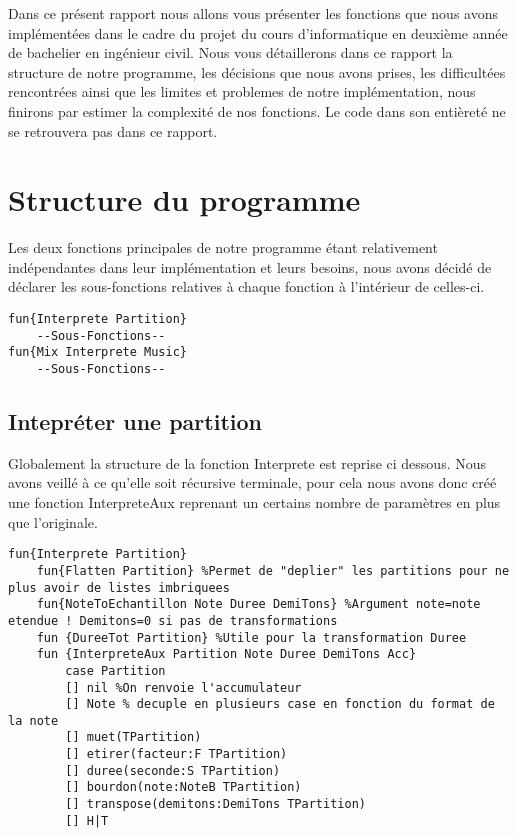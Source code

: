 \documentclass[a4paper,12pt]{report}
\begin{document}



Dans ce présent rapport nous allons vous présenter les fonctions que nous avons implémentées dans le cadre du projet du cours d'informatique en deuxième année de bachelier en ingénieur civil. Nous vous détaillerons dans ce rapport la structure de notre programme, les décisions que nous avons prises, les difficultées rencontrées ainsi que les limites et problemes de notre implémentation, nous finirons par estimer la complexité de nos fonctions. Le code dans son entièreté ne se retrouvera pas dans ce rapport.

\section*{Structure du programme}
Les deux fonctions principales de notre programme étant relativement indépendantes dans leur implémentation et leurs besoins, nous avons décidé de déclarer les sous-fonctions relatives à chaque fonction à l'intérieur de celles-ci.
\begin{lstlisting}[frame=single] 
fun{Interprete Partition}
	--Sous-Fonctions--
fun{Mix Interprete Music}
	--Sous-Fonctions--
\end{lstlisting}

\subsection*{Intepréter une partition}
Globalement la structure de la fonction Interprete est reprise ci dessous. Nous avons veillé à ce qu'elle soit récursive terminale, pour cela nous avons donc créé une fonction InterpreteAux reprenant un certains nombre de paramètres en plus que l'originale. 
\begin{lstlisting}[frame=single] 
fun{Interprete Partition}
	fun{Flatten Partition} %Permet de "deplier" les partitions pour ne plus avoir de listes imbriquees
	fun{NoteToEchantillon Note Duree DemiTons} %Argument note=note etendue ! Demitons=0 si pas de transformations
	fun {DureeTot Partition} %Utile pour la transformation Duree 
	fun {InterpreteAux Partition Note Duree DemiTons Acc}
		case Partition
		[] nil %On renvoie l'accumulateur
		[] Note % decuple en plusieurs case en fonction du format de la note
		[] muet(TPartition)
		[] etirer(facteur:F TPartition)
		[] duree(seconde:S TPartition)
		[] bourdon(note:NoteB TPartition)
		[] transpose(demitons:DemiTons TPartition)
		[] H|T			
\end{lstlisting}
\end{document}
